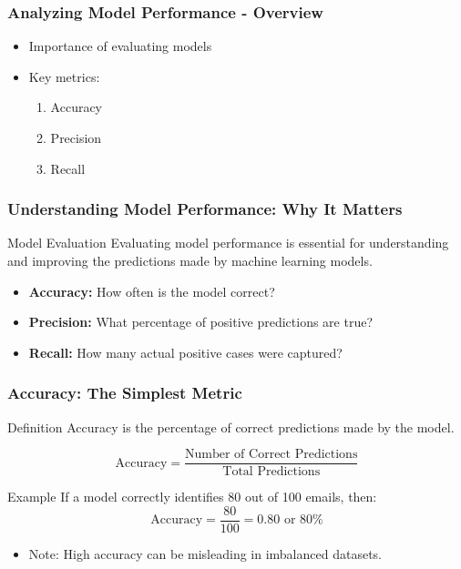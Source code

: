 \documentclass[aspectratio=169]{beamer}
\begin{document}
\begin{frame}[fragile]
    \frametitle{Analyzing Model Performance - Overview}
    \begin{itemize}
        \item Importance of evaluating models
        \item Key metrics:
        \begin{enumerate}
            \item Accuracy
            \item Precision
            \item Recall
        \end{enumerate}
    \end{itemize}
\end{frame}

\begin{frame}[fragile]
    \frametitle{Understanding Model Performance: Why It Matters}
    \begin{block}{Model Evaluation}
        Evaluating model performance is essential for understanding and improving the predictions made by machine learning models.
    \end{block}
    \begin{itemize}
        \item \textbf{Accuracy:} How often is the model correct?
        \item \textbf{Precision:} What percentage of positive predictions are true?
        \item \textbf{Recall:} How many actual positive cases were captured?
    \end{itemize}
\end{frame}

\begin{frame}[fragile]
    \frametitle{Accuracy: The Simplest Metric}
    \begin{block}{Definition}
        Accuracy is the percentage of correct predictions made by the model.
    \end{block}
    \begin{equation}
        \text{Accuracy} = \frac{\text{Number of Correct Predictions}}{\text{Total Predictions}}
    \end{equation}
    \begin{exampleblock}{Example}
        If a model correctly identifies 80 out of 100 emails, then: 
        \[
        \text{Accuracy} = \frac{80}{100} = 0.80 \text{ or } 80\%
        \]
    \end{exampleblock}
    \begin{itemize}
        \item Note: High accuracy can be misleading in imbalanced datasets.
    \end{itemize}
\end{frame}
\end{document}
